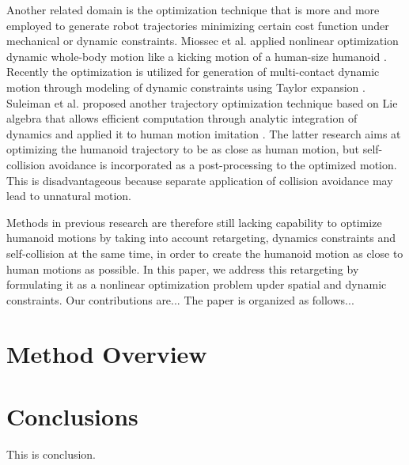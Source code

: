 \documentclass[letterpaper, 10 pt, conference]{ieeeconf}  %
\begin{document}
Another related domain is the optimization technique that is more and
more employed to generate robot trajectories minimizing certain cost
function under mechanical or dynamic constraints.
Miossec et al. applied nonlinear optimization dynamic whole-body motion
like a kicking motion of a human-size humanoid \cite{Miossec06ROBIO}.
Recently the optimization is utilized for generation of multi-contact
dynamic motion through modeling of dynamic constraints using Taylor
expansion \cite{Lengagne13IJRR}.
Suleiman et al. proposed another trajectory optimization technique
based on Lie 
algebra that allows efficient computation through analytic integration
of dynamics \cite{Suleiman07Humanoids} and applied it to human motion
imitation \cite{Suleiman08ICRA}. 
The latter research aims at optimizing the humanoid trajectory to be as
close as human motion, but self-collision avoidance is incorporated as
a post-processing to the optimized motion. This is disadvantageous
because separate application of collision avoidance may lead to
unnatural motion. 


Methods in previous research are therefore still lacking 
capability to optimize humanoid motions by taking into account 
retargeting, dynamics constraints and
self-collision at the same time, in
order to create the humanoid motion as close to human motions as possible.
In this paper, we address this retargeting by formulating it
as a nonlinear optimization problem upder spatial and
dynamic constraints.
Our contributions are...
The paper is organized as follows...

\section{Method Overview}
\label{sec:overview}


\section{Conclusions}

This is conclusion.

\end{document}
